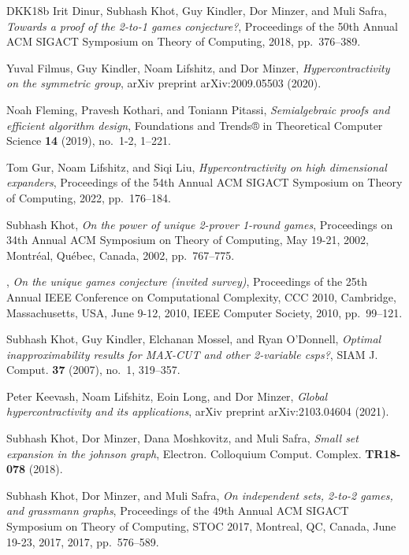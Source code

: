 \documentclass[11pt]{article}
\theoremstyle{definition}
\begin{document}
\begin{thebibliography}{DKK{\etalchar{+}}18b}
Irit Dinur, Subhash Khot, Guy Kindler, Dor Minzer, and Muli Safra,
  \emph{Towards a proof of the 2-to-1 games conjecture?}, Proceedings of the
  50th Annual ACM SIGACT Symposium on Theory of Computing, 2018, pp.~376--389.

Yuval Filmus, Guy Kindler, Noam Lifshitz, and Dor Minzer,
  \emph{Hypercontractivity on the symmetric group}, arXiv preprint
  arXiv:2009.05503 (2020).

Noah Fleming, Pravesh Kothari, and Toniann Pitassi, \emph{Semialgebraic proofs
  and efficient algorithm design}, Foundations and Trends® in Theoretical
  Computer Science \textbf{14} (2019), no.~1-2, 1--221.

Tom Gur, Noam Lifshitz, and Siqi Liu, \emph{Hypercontractivity on high
  dimensional expanders}, Proceedings of the 54th Annual ACM SIGACT Symposium
  on Theory of Computing, 2022, pp.~176--184.

Subhash Khot, \emph{On the power of unique 2-prover 1-round games}, Proceedings
  on 34th Annual {ACM} Symposium on Theory of Computing, May 19-21, 2002,
  Montr{\'{e}}al, Qu{\'{e}}bec, Canada, 2002, pp.~767--775.

\bysame, \emph{On the unique games conjecture (invited survey)}, Proceedings of
  the 25th Annual {IEEE} Conference on Computational Complexity, {CCC} 2010,
  Cambridge, Massachusetts, USA, June 9-12, 2010, {IEEE} Computer Society,
  2010, pp.~99--121.

Subhash Khot, Guy Kindler, Elchanan Mossel, and Ryan O'Donnell, \emph{Optimal
  inapproximability results for {MAX-CUT} and other 2-variable csps?}, {SIAM}
  J. Comput. \textbf{37} (2007), no.~1, 319--357.

Peter Keevash, Noam Lifshitz, Eoin Long, and Dor Minzer, \emph{Global
  hypercontractivity and its applications}, arXiv preprint arXiv:2103.04604
  (2021).

Subhash Khot, Dor Minzer, Dana Moshkovitz, and Muli Safra, \emph{Small set
  expansion in the johnson graph}, Electron. Colloquium Comput. Complex.
  \textbf{{TR18-078}} (2018).

Subhash Khot, Dor Minzer, and Muli Safra, \emph{On independent sets, 2-to-2
  games, and grassmann graphs}, Proceedings of the 49th Annual {ACM} {SIGACT}
  Symposium on Theory of Computing, {STOC} 2017, Montreal, QC, Canada, June
  19-23, 2017, 2017, pp.~576--589.


\end{thebibliography}
\end{document}
